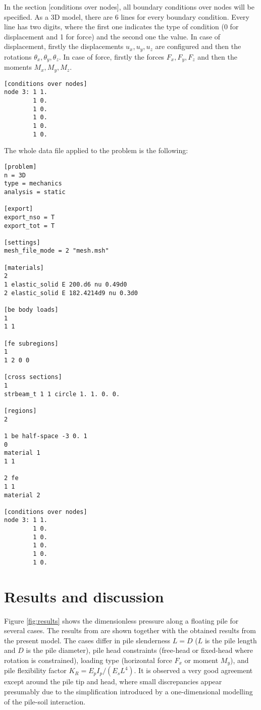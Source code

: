 \documentclass[a4]{article}
\begin{document}
In the section [conditions over nodes], all boundary conditions over nodes will be specified. As a 3D model, there are 6 lines for every boundary condition. Every line has two digits, where the first one indicates the type of condition (0 for displacement and 1 for force) and the second one the value. In case of displacement, firstly the displacements $u_x, u_y, u_z$ are configured and then the rotations $\theta_x, \theta_y, \theta_z$. In case of force, firstly the forces $F_x, F_y, F_z$ and then the moments $M_x, M_y, M_z$. 

\begin{Verbatim}	
[conditions over nodes]
node 3: 1 1.
        1 0.
        1 0.
        1 0.
        1 0.
        1 0.
\end{Verbatim}

The whole data file applied to the problem is the following:

\begin{Verbatim}
[problem]
n = 3D
type = mechanics
analysis = static

[export]
export_nso = T
export_tot = T

[settings]
mesh_file_mode = 2 "mesh.msh"

[materials]
2
1 elastic_solid E 200.d6 nu 0.49d0
2 elastic_solid E 182.4214d9 nu 0.3d0

[be body loads]
1
1 1

[fe subregions]
1
1 2 0 0

[cross sections]
1
strbeam_t 1 1 circle 1. 1. 0. 0.

[regions]
2

1 be half-space -3 0. 1
0
material 1
1 1

2 fe
1 1
material 2

[conditions over nodes]
node 3: 1 1.
        1 0.
        1 0.
        1 0.
        1 0.
        1 0.
\end{Verbatim}

\section{Results and discussion}

Figure \ref{fig:results} shows the dimensionless pressure along a floating pile for several cases. The results from \cite{poulos} are shown together with the obtained results from the present model. The cases differ in pile slenderness $L=D$ ($ L $ is the pile length and $ D $ is the pile diameter), pile head constraints (free-head or fixed-head where rotation is constrained), loading type (horizontal force $ F_x $ or moment $ M_y $), and pile flexibility factor $ K_R = E_pI_p /(E_sL^4) $. It is observed a very good agreement except around the pile tip and head, where small discrepancies appear presumably due to the simplification introduced by a one-dimensional modelling of the pile-soil interaction.
\end{document}
